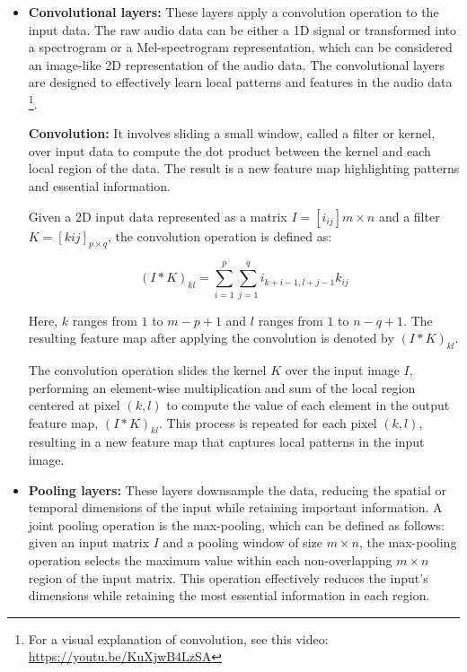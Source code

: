 \begin{itemize}

\item \textbf{Convolutional layers:} These layers apply a convolution operation to the input data. The raw audio data can be either a 1D signal or transformed into a spectrogram or a Mel-spectrogram representation, which can be considered an image-like 2D representation of the audio data. The convolutional layers are designed to effectively learn local patterns and features in the audio data \footnote{For a visual explanation of convolution, see this video: \url{https://youtu.be/KuXjwB4LzSA}}.

\textbf{Convolution:} It involves sliding a small window, called a filter or kernel, over input data to compute the dot product between the kernel and each local region of the data. The result is a new feature map highlighting patterns and essential information.

Given a 2D input data represented as a matrix $I = [i_{ij}]{m \times n}$ and a filter $K = [k{ij}]_{p \times q}$, the convolution operation is defined as:

$$(I * K)_{kl} = \sum_{i=1}^{p} \sum_{j=1}^{q} i_{k+i-1, l+j-1}k_{ij}$$

Here, $k$ ranges from $1$ to $m-p+1$ and $l$ ranges from $1$ to $n-q+1$. The resulting feature map after applying the convolution is denoted by $(I * K)_{kl}$.

The convolution operation slides the kernel $K$ over the input image $I$, performing an element-wise multiplication and sum of the local region centered at pixel $(k,l)$ to compute the value of each element in the output feature map, $(I * K)_{kl}$. This process is repeated for each pixel $(k,l)$, resulting in a new feature map that captures local patterns in the input image.



\item \textbf{Pooling layers:} These layers downsample the data, reducing the spatial or temporal dimensions of the input while retaining important information. A joint pooling operation is the max-pooling, which can be defined as follows: given an input matrix $I$ and a pooling window of size $m \times n$, the max-pooling operation selects the maximum value within each non-overlapping $m \times n$ region of the input matrix. This operation effectively reduces the input's dimensions while retaining the most essential information in each region.
\vspace*{3mm}


\end{itemize}
